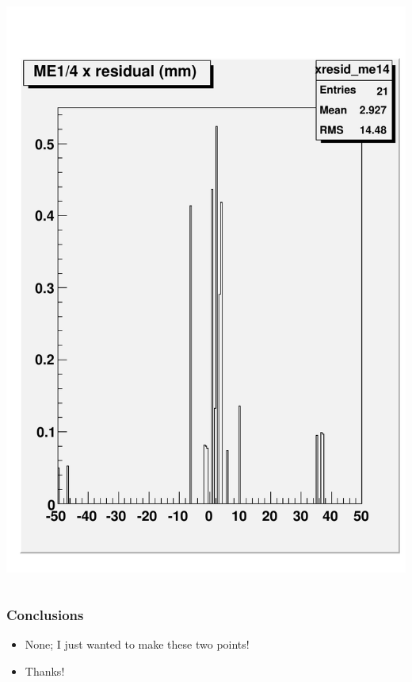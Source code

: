 \documentclass[compress]{beamer}
\begin{document}
\begin{frame}
\begin{columns}
\includegraphics[width=0.7\linewidth]{talk_me14_xresid_207.pdf}
\end{columns}
\end{frame}




\begin{frame}
\frametitle{Conclusions}

\begin{itemize}\setlength{\itemsep}{0.75 cm}
\item None; I just wanted to make these two points!
\item Thanks!
\end{itemize}

\label{numpages}
\end{frame}
\end{document}
